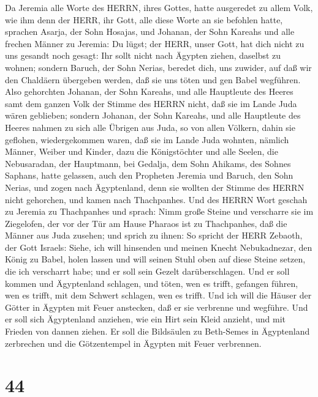  Da Jeremia alle Worte des HERRN, ihres Gottes, hatte
ausgeredet zu allem Volk, wie ihm denn der HERR, ihr Gott, alle diese
Worte an sie befohlen hatte,  sprachen Asarja, der Sohn
Hosajas, und Johanan, der Sohn Kareahs und alle frechen Männer zu
Jeremia: Du lügst; der HERR, unser Gott, hat dich nicht zu uns gesandt
noch gesagt: Ihr sollt nicht nach Ägypten ziehen, daselbst zu wohnen;
 sondern Baruch, der Sohn Nerias, beredet dich, uns zuwider,
auf daß wir den Chaldäern übergeben werden, daß sie uns töten und gen
Babel wegführen.  Also gehorchten Johanan, der Sohn Kareahs,
und alle Hauptleute des Heeres samt dem ganzen Volk der Stimme des HERRN
nicht, daß sie im Lande Juda wären geblieben;  sondern
Johanan, der Sohn Kareahs, und alle Hauptleute des Heeres nahmen zu sich
alle Übrigen aus Juda, so von allen Völkern, dahin sie geflohen,
wiedergekommen waren, daß sie im Lande Juda wohnten, 
nämlich Männer, Weiber und Kinder, dazu die Königstöchter und alle
Seelen, die Nebusaradan, der Hauptmann, bei Gedalja, dem Sohn Ahikams,
des Sohnes Saphans, hatte gelassen, auch den Propheten Jeremia und
Baruch, den Sohn Nerias,  und zogen nach Ägyptenland, denn
sie wollten der Stimme des HERRN nicht gehorchen, und kamen nach
Thachpanhes.  Und des HERRN Wort geschah zu Jeremia zu
Thachpanhes und sprach:  Nimm große Steine und verscharre
sie im Ziegelofen, der vor der Tür am Hause Pharaos ist zu Thachpanhes,
daß die Männer aus Juda zusehen;  und sprich zu ihnen: So
spricht der HERR Zebaoth, der Gott Israels: Siehe, ich will hinsenden
und meinen Knecht Nebukadnezar, den König zu Babel, holen lassen und
will seinen Stuhl oben auf diese Steine setzen, die ich verscharrt habe;
und er soll sein Gezelt darüberschlagen.  Und er soll
kommen und Ägyptenland schlagen, und töten, wen es trifft, gefangen
führen, wen es trifft, mit dem Schwert schlagen, wen es trifft.
 Und ich will die Häuser der Götter in Ägypten mit Feuer
anstecken, daß er sie verbrenne und wegführe. Und er soll sich
Ägyptenland anziehen, wie ein Hirt sein Kleid anzieht, und mit Frieden
von dannen ziehen.  Er soll die Bildsäulen zu Beth-Semes in
Ägyptenland zerbrechen und die Götzentempel in Ägypten mit Feuer
verbrennen.

\hypertarget{section-43}{%
\section{44}\label{section-43}}

